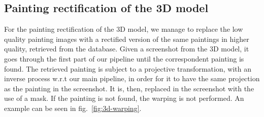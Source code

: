 \subsection{Painting rectification of the 3D model}

For the painting rectification of the 3D model, we manage to replace the low quality painting images with a rectified version of the same paintings in higher quality, retrieved from the database. Given a screenshot from the 3D model, it goes through the first part of our pipeline until the correspondent painting is found. The retrieved painting is subject to a projective transformation, with an inverse process w.r.t our main pipeline, in order for it to have the same projection as the painting in the screenshot. It is, then, replaced in the screenshot with the use of a mask. If the painting is not found, the warping is not performed. An example can be seen in fig.~\ref{fig:3d-warping}.

